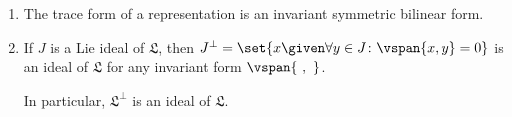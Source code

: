 \begin{enumerate}[label=(\roman*)]
	\item The trace form of a representation is an invariant symmetric bilinear form.
	\item If $J$ is a Lie ideal of $\mathfrak{L}$, then $J^{\perp} = \set{x\given \forall y \in J\colon \vspan{x, y} = 0}$
		is an ideal of $\mathfrak{L}$ for any invariant form $\vspan{\ ,\ }$.

		In particular, $\mathfrak{L}^{\perp}$ is an ideal of $\mathfrak{L}$.
\end{enumerate}
